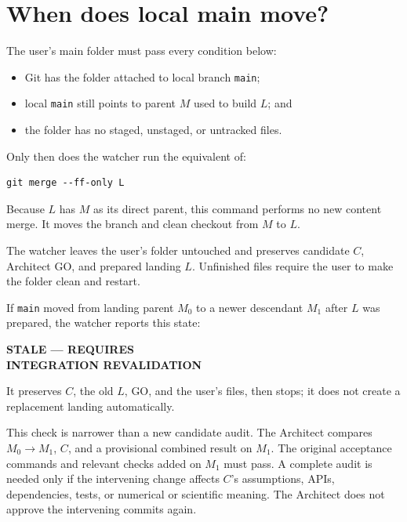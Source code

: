 \documentclass[10pt,twocolumn]{article}
\newcommand{\code}[1]{\texttt{#1}}
\begin{document}
\section{When does local main move?}

The user's main folder must pass every condition below:

\begin{itemize}
  \item Git has the folder attached to local branch \code{main};
  \item local \code{main} still points to parent $M$ used to build $L$; and
  \item the folder has no staged, unstaged, or untracked files.
\end{itemize}

Only then does the watcher run the equivalent of:

\begin{lstlisting}
git merge --ff-only L
\end{lstlisting}

Because $L$ has $M$ as its direct parent, this command performs no new
content merge. It moves the branch and clean checkout from $M$ to $L$.

\begin{stopbox}
The watcher leaves the user's folder untouched and preserves candidate $C$,
Architect GO, and prepared landing $L$. Unfinished files require the user to
make the folder clean and restart.
\end{stopbox}

If \code{main} moved from landing parent $M_0$ to a newer descendant $M_1$
after $L$ was prepared, the watcher reports this state:
\begin{center}
\footnotesize\bfseries STALE --- REQUIRES\\
INTEGRATION REVALIDATION
\end{center}
It preserves $C$, the old $L$, GO, and the user's files, then stops; it does
not create a replacement landing automatically.

This check is narrower than a new candidate audit. The Architect compares
$M_0\mathbin{\rightarrow}M_1$, $C$, and a provisional combined result on
$M_1$. The original acceptance commands and relevant checks added on $M_1$
must pass. A complete audit is needed only if the intervening change affects
$C$'s assumptions, APIs, dependencies, tests, or numerical or scientific
meaning. The Architect does not approve the intervening commits again.
\end{document}
